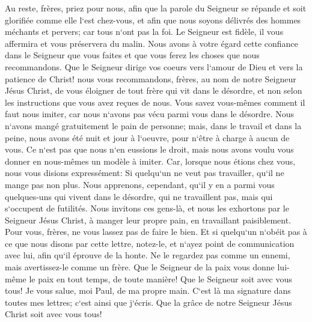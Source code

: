 \verse Au reste, frères, priez pour nous, afin que la parole du Seigneur se répande et soit glorifiée comme elle l`est chez-vous, 
\verse et afin que nous soyons délivrés des hommes méchants et pervers; car tous n`ont pas la foi. 
\verse Le Seigneur est fidèle, il vous affermira et vous préservera du malin. 
\verse Nous avons à votre égard cette confiance dans le Seigneur que vous faites et que vous ferez les choses que nous recommandons. 
\verse Que le Seigneur dirige vos coeurs vers l`amour de Dieu et vers la patience de Christ! 
\verse nous vous recommandons, frères, au nom de notre Seigneur Jésus Christ, de vous éloigner de tout frère qui vit dans le désordre, et non selon les instructions que vous avez reçues de nous. 
\verse Vous savez vous-mêmes comment il faut nous imiter, car nous n`avons pas vécu parmi vous dans le désordre. 
\verse Nous n`avons mangé gratuitement le pain de personne; mais, dans le travail et dans la peine, nous avons été nuit et jour à l`oeuvre, pour n`être à charge à aucun de vous. 
\verse Ce n`est pas que nous n`en eussions le droit, mais nous avons voulu vous donner en nous-mêmes un modèle à imiter. 
\verse Car, lorsque nous étions chez vous, nous vous disions expressément: Si quelqu`un ne veut pas travailler, qu`il ne mange pas non plus. 
\verse Nous apprenons, cependant, qu`il y en a parmi vous quelques-uns qui vivent dans le désordre, qui ne travaillent pas, mais qui s`occupent de futilités. 
\verse Nous invitons ces gens-là, et nous les exhortons par le Seigneur Jésus Christ, à manger leur propre pain, en travaillant paisiblement. 
\verse Pour vous, frères, ne vous lassez pas de faire le bien. 
\verse Et si quelqu`un n`obéit pas à ce que nous disons par cette lettre, notez-le, et n`ayez point de communication avec lui, afin qu`il éprouve de la honte. 
\verse Ne le regardez pas comme un ennemi, mais avertissez-le comme un frère. 
\verse Que le Seigneur de la paix vous donne lui-même le paix en tout temps, de toute manière! Que le Seigneur soit avec vous tous! 
\verse Je vous salue, moi Paul, de ma propre main. C`est là ma signature dans toutes mes lettres; c`est ainsi que j`écris. 
\verse Que la grâce de notre Seigneur Jésus Christ soit avec vous tous! 
